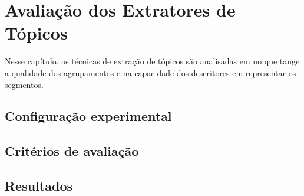 \chapter{Avaliação dos Extratores de Tópicos}\label{cap-extratores}

Nesse capítulo, as técnicas de extração de tópicos são analisadas em no que tange a qualidade dos agrupamentos e na capacidade dos descritores em representar os segmentos.


\section{Configuração experimental}


\section{Critérios de avaliação}


\section{Resultados}



